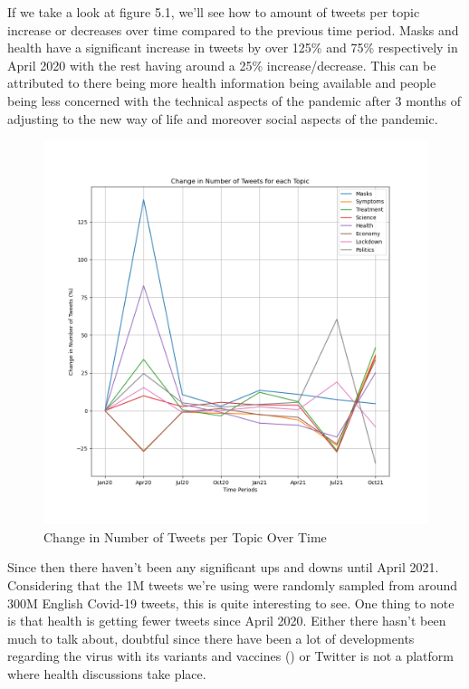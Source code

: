 \documentclass{l4proj}
\begin{document}
If we take a look at figure 5.1, we'll see how to amount of tweets per topic increase or decreases over time compared to the previous time period. Masks and health have a significant increase in tweets by over 125\% and 75\% respectively in April 2020 with the rest having around a 25\% increase/decrease. This can be attributed to there being more health information being available and people being less concerned with the technical aspects of the pandemic after 3 months of adjusting to the new way of life and moreover social aspects of the pandemic.

\begin{figure}[h]
    \centering
    \includegraphics[width=1.0\linewidth]{images/topicNum.png}
    \caption{Change in Number of Tweets per Topic Over Time}
\end{figure}

Since then there haven't been any significant ups and downs until April 2021. Considering that the 1M tweets we're using were randomly sampled from around 300M English Covid-19 tweets, this is quite interesting to see. One thing to note is that health is getting fewer tweets since April 2020. Either there hasn't been much to talk about, doubtful since there have been a lot of developments regarding the virus with its variants and vaccines (\cite{covidhist}) or Twitter is not a platform where health discussions take place.
\end{document}
